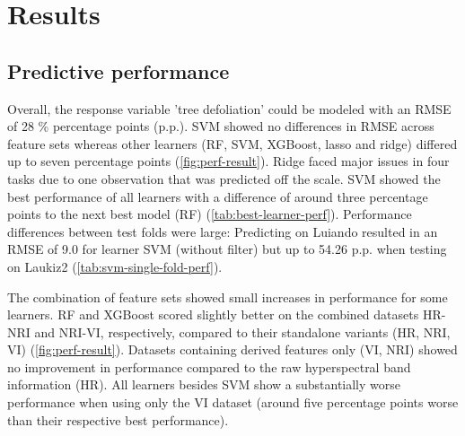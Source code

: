 \documentclass[letterpaper, peerreview, draftcls]{IEEEtran}
\begin{document}
\section{Results}

\subsection{Predictive performance}

\noindent Overall, the response variable 'tree defoliation' could be modeled with an \ac{RMSE} of 28 \% percentage points (p.p.).
SVM showed no differences in RMSE across feature sets whereas other learners (RF, SVM, XGBoost, lasso and ridge) differed up to seven percentage points (\autoref{fig:perf-result}).
Ridge faced major issues in four tasks due to one observation that was predicted off the scale.
SVM showed the best performance of all learners with a difference of around three percentage points to the next best model (RF) (\autoref{tab:best-learner-perf}).
Performance differences between test folds were large: Predicting on Luiando resulted in an RMSE of 9.0 for learner SVM (without filter) but up to 54.26 p.p. when testing on Laukiz2 (\autoref{tab:svm-single-fold-perf}).

The combination of feature sets showed small increases in performance for some learners.
RF and XGBoost scored slightly better on the combined datasets HR-NRI and NRI-VI, respectively, compared to their standalone variants (HR, NRI, VI) (\autoref{fig:perf-result}).
Datasets containing derived features only (VI, NRI) showed no improvement in performance compared to the raw hyperspectral band information (HR).
All learners besides SVM show a substantially worse performance when using only the VI dataset (around five percentage points worse than their respective best performance).
\end{document}

